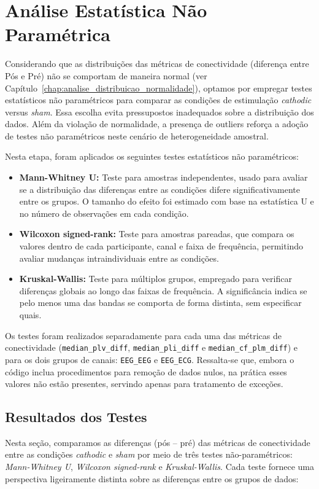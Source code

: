 \chapter{Análise Estatística Não Paramétrica}
\label{chap:analise_estatistica_np}
Considerando que as distribuições das métricas de conectividade (diferença entre Pós e Pré) não se comportam de maneira normal (ver Capítulo~\ref{chap:analise_distribuicao_normalidade}), optamos por empregar testes estatísticos não paramétricos para comparar as condições de estimulação \textit{cathodic} versus \textit{sham}. Essa escolha evita pressupostos inadequados sobre a distribuição dos dados. Além da violação de normalidade, a presença de outliers reforça a adoção de testes não paramétricos neste cenário de heterogeneidade amostral.

Nesta etapa, foram aplicados os seguintes testes estatísticos não paramétricos:

\begin{itemize}
    \item \textbf{Mann-Whitney U:} Teste para amostras independentes, usado para avaliar se a distribuição das diferenças entre as condições difere significativamente entre os grupos. O tamanho do efeito foi estimado com base na estatística U e no número de observações em cada condição.
    
    \item \textbf{Wilcoxon signed-rank:} Teste para amostras pareadas, que compara os valores dentro de cada participante, canal e faixa de frequência, permitindo avaliar mudanças intraindividuais entre as condições.

    \item \textbf{Kruskal-Wallis:} Teste para múltiplos grupos, empregado para verificar diferenças globais ao longo das faixas de frequência. A significância indica se pelo menos uma das bandas se comporta de forma distinta, sem especificar quais.
\end{itemize}

Os testes foram realizados separadamente para cada uma das métricas de conectividade (\texttt{median\_plv\_diff}, \texttt{median\_pli\_diff} e \texttt{median\_cf\_plm\_diff}) e para os dois grupos de canais: \texttt{EEG\_EEG} e \texttt{EEG\_ECG}. Ressalta-se que, embora o código inclua procedimentos para remoção de dados nulos, na prática esses valores não estão presentes, servindo apenas para tratamento de exceções.

\section{Resultados dos Testes}
Nesta seção, comparamos as diferenças (pós -- pré) das métricas de conectividade entre as condições \textit{cathodic} e \textit{sham} por meio de três testes não-paramétricos: \emph{Mann-Whitney U}, \emph{Wilcoxon signed-rank} e \emph{Kruskal-Wallis}. Cada teste fornece uma perspectiva ligeiramente distinta sobre as diferenças entre os grupos de dados:

